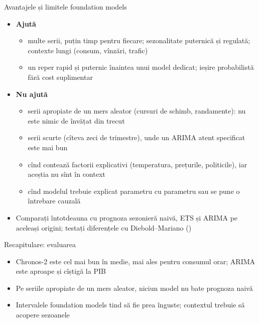 \begin{frame}{Avantajele și limitele foundation models}
\itemsize{\footnotesize}
\begin{itemize}
    \item \textbf{Ajută}
    \begin{itemize}
        \item multe serii, puțin timp pentru fiecare; sezonalitate puternică și regulată; contexte lungi (consum, vînzări, trafic)
        \item un reper rapid și puternic înaintea unui model dedicat; ieșire probabilistă fără cost suplimentar
    \end{itemize}
    \item \textbf{Nu ajută}
    \begin{itemize}
        \item serii apropiate de un mers aleator (cursuri de schimb, randamente): nu este nimic de învățat din trecut
        \item serii scurte (cîteva zeci de trimestre), unde un ARIMA atent specificat este mai bun
        \item cînd contează factorii explicativi (temperatura, prețurile, politicile), iar aceștia nu sînt în context
        \item cînd modelul trebuie explicat parametru cu parametru sau se pune o întrebare cauzală
    \end{itemize}
    \item Comparați întotdeauna cu prognoza sezonieră naivă, ETS și ARIMA pe aceleași origini; testați diferențele cu Diebold--Mariano ()
\end{itemize}
\end{frame}

\begin{frame}{Recapitulare: evaluarea}
\itemsize{\small}
\begin{itemize}
    \item Chronos-2 este cel mai bun în medie, mai ales pentru consumul orar; ARIMA este aproape și cîștigă la PIB
    \item Pe seriile apropiate de un mers aleator, niciun model nu bate prognoza naivă
    \item Intervalele foundation models tind să fie prea înguste; contextul trebuie să acopere sezoanele
\end{itemize}
\end{frame}


